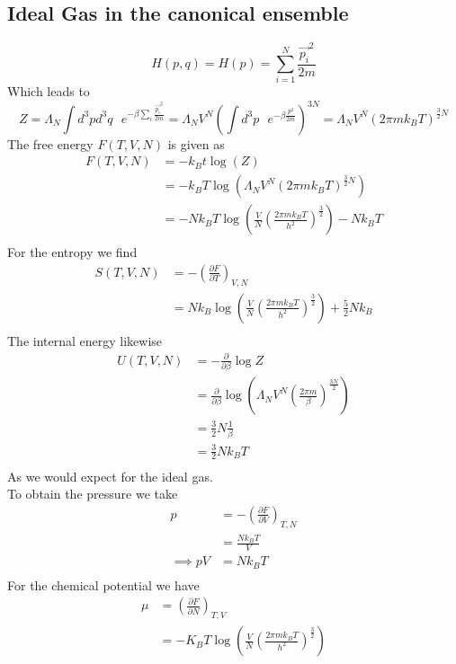 \documentclass{report}
\begin{document}
\subsection{Ideal Gas in the canonical ensemble}
\[
  H\left( p,q \right) = H\left( p \right) = \sum_{i=1}^{N}  \frac{\vec{p_i}^2}{2m} 
\] Which leads to \[
Z = \Lambda_N \int d^{3}p d^{3}q \text{ } e^{-\beta \sum_i \frac{\vec{p_i}^2}{2m} } = \Lambda_N V^{N} \left( \int d^{3}p \text{ } e^{-\beta \frac{p^2}{2m}} \right)^{3N} = \Lambda_N V^{N} \left( 2\pi m k_B T \right) ^{\frac{3}{2} N}
\] 
The free energy $F\left( T,V,N \right)$ is given as 
\begin{align*}
  F\left( T,V,N \right) &= -k_B t \log\left( Z \right)  \\
                        &= -k_B T \log\left( \Lambda_N V^N \left( 2 \pi m k_B T \right) ^{\frac{3}{2}N} \right)  \\
                        &= -N k_B T \log\left( \frac{V}{N} \left( \frac{2\pi m k_B T}{h^2} \right) ^{\frac{3}{2}} \right) - Nk_B T \\
\end{align*}
For the entropy we find 
\begin{align*}
  S\left( T,V,N \right) &=  -\left( \frac{\partial F }{\partial T} \right)_{V,N} \\
  &= N k_B \log\left( \frac{V}{N} \left( \frac{2 \pi m k_B T}{h^2} \right) ^{\frac{3}{2}} \right) + \frac{5}{2} N k_B \\
\end{align*}
The internal energy likewise
\begin{align*}
  U\left( T,V,N \right) &= - \frac{\partial }{\partial \beta} \log Z\\
                        &= \frac{\partial }{\partial \beta} \log\left( \Lambda_N V^N \left( \frac{2 \pi m}{\beta} \right) ^{\frac{3N}{2}} \right)  \\
                        &= \frac{3}{2}N \frac{1}{\beta} \\
                        &= \frac{3}{2} N k_B T \\
\end{align*}
As we would expect for the ideal gas.\\
To obtain the pressure we take
\begin{align*}
  p &= - \left( \frac{\partial F}{\partial V} \right) _{T,N} \\
  &= \frac{Nk_BT}{V} \\
  \implies pV &= Nk_B T\\
\end{align*}
For the chemical potential we have
\begin{align*}
  \mu &= \left( \frac{\partial F}{\partial N} \right) _{T,V} \\
      &= - K_B T \log\left( \frac{V}{N} \left( \frac{2\pi m k_B T}{h^2} \right) ^{\frac{3}{2}} \right) \\
\end{align*}
\end{document}
